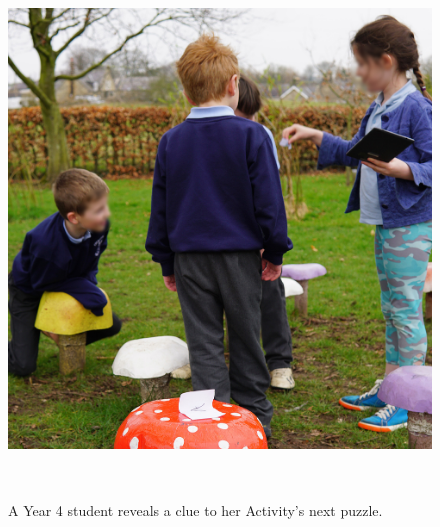 \documentclass[,hyphens]{sigchi}
\begin{document}
\begin{figure}
\centering
  \includegraphics[width=0.8\columnwidth]{figures/mushrooms}
  \caption{A Year 4 student reveals a clue to her Activity's next puzzle. }~\label{fig:Mushrooms}
\end{figure}
\end{document}
